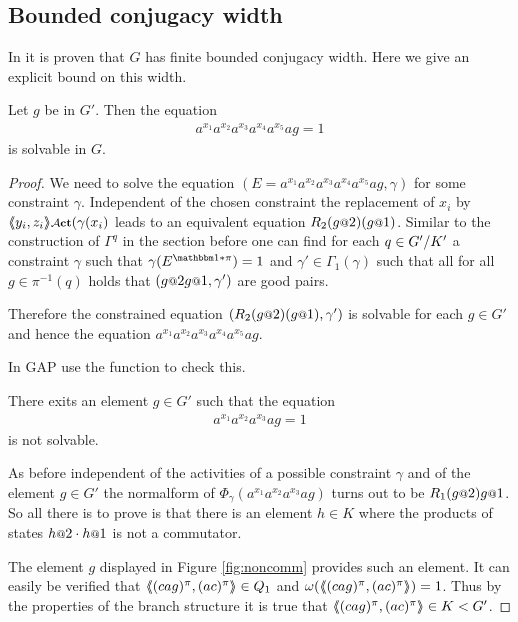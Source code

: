 \documentclass[a4paper,11pt]{amsart}
\begin{document}
\subsection{Bounded conjugacy width}
In \cite{Fink:Conjugacy_growth} it is proven that $G$ has finite bounded conjugacy width. Here we give an explicit bound 
on this width.
\begin{pro}
 Let $g$ be in $G'$. Then the equation 
 \begin{align*}
  a^{x_1}a^{x_2}a^{x_3}a^{x_4}a^{x_5}ag=1
 \end{align*}
is solvable in $G$. 
\end{pro}
\begin{proof}
We need to solve the equation $(E=a^{x_1}a^{x_2}a^{x_3}a^{x_4}a^{x_5}ag,\gamma)$ for
some constraint $\gamma$. Independent of the chosen constraint the replacement of
$x_i$ by $\pair{y_i,z_i}\act(\gamma(x_i)$ leads to an equivalent equation 
$R_2(g\at{2})(g\at{1})$. Similar to the construction of $\Gamma^q$ in the section
before one can find for each $q\in{G'/K'}$ a constraint $\gamma$ such that
$\gamma(E^{\id*\pi})=1$ and $\gamma'\in\Gamma_1(\gamma)$ such that all for all 
$g\in\pi^{-1}(q)$ holds that $(g\at{2}g\at{1},\gamma')$ are good pairs.

Therefore the constrained equation $(R_2(g\at{2})(g\at{1}),\gamma')$ is solvable
for each $g\in G'$ and hence the equation $a^{x_1}a^{x_2}a^{x_3}a^{x_4}a^{x_5}ag$.

In GAP use the function  to check this.
\begin{lem}
 There exits an element $g\in G'$ such that the equation 
 \begin{align*}
  a^{x_1}a^{x_2}a^{x_3}ag=1
 \end{align*}
 is not solvable.
\end{lem}
As before independent of the activities of a possible constraint $\gamma$ and of the element $g\in G'$
the normalform of $\Phi_\gamma(a^{x_1}a^{x_2}a^{x_3}ag)$ turns out to
be $R_1(g\at{2}) g\at{1}$. So all there is to prove is that there is an element $h\in K$
where the products of states $h\at{2}\cdot h\at{1}$ is not a commutator.

The element $g$ displayed in Figure \ref{fig:noncomm} provides such an element. It can easily be verified 
that $\langle\negthickspace\langle(cag)^\pi,(ac)^\pi\rangle\negthickspace\rangle\in Q_1$ and $\omega(\langle\negthickspace\langle(cag)^\pi,(ac)^\pi\rangle\negthickspace\rangle)=1$. Thus by
the properties of the branch structure it is true that $\langle\negthickspace\langle(cag)^\pi,(ac)^\pi\rangle\negthickspace\rangle\in K<G'$. 
\end{proof}
\end{document}
